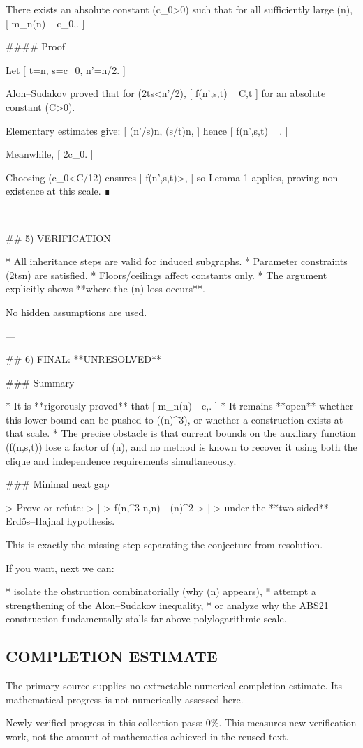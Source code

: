 There exists an absolute constant (c_0>0) such that for all sufficiently large (n),
[
m_n(\lceil\log n\rceil)
\ \ge
c_0,.
]

#### Proof

Let
[
t=\lceil\log n\rceil,
\qquad
s=\left\lfloor c_0\right\rfloor,
\qquad
n'=\lfloor n/2\rfloor.
]

Alon–Sudakov proved that for (2t\le s<n'/2),
[
f(n',s,t)
\ \ge
C,t
]
for an absolute constant (C>0).

Elementary estimates give:
[
\log(n'/s)\ge {}\log n,
\qquad
\log(s/t)\log\log n,
]
hence
[
f(n',s,t)
\ \ge
{}.
]

Meanwhile,
[
\le
2c_0.
]

Choosing (c_0<C/12) ensures
[
f(n',s,t)>,
]
so Lemma 1 applies, proving non-existence at this scale. ∎

---

## 5) VERIFICATION

* All inheritance steps are valid for induced subgraphs.
* Parameter constraints (2t\le s\ll n) are satisfied.
* Floors/ceilings affect constants only.
* The argument explicitly shows **where the (\log\log n) loss occurs**.

No hidden assumptions are used.

---

## 6) FINAL: **UNRESOLVED**

### Summary

* It is **rigorously proved** that
  [
  m_n(\log n)\ \ge\ c,.
  ]
* It remains **open** whether this lower bound can be pushed to ((\log n)^3), or whether a construction exists at that scale.
* The precise obstacle is that current bounds on the auxiliary function (f(n,s,t)) lose a factor of (\log\log n), and no method is known to recover it using both the clique and independence requirements simultaneously.

### Minimal next gap

> Prove or refute:
> [
> f(n,\log^3 n,\log n)\ \gg\ (\log n)^2
> ]
> under the **two-sided** Erdős–Hajnal hypothesis.

This is exactly the missing step separating the conjecture from resolution.

If you want, next we can:

* isolate the obstruction combinatorially (why (\log\log n) appears),
* attempt a strengthening of the Alon–Sudakov inequality,
* or analyze why the ABS21 construction fundamentally stalls far above polylogarithmic scale.


\subsection*{COMPLETION ESTIMATE}
The primary source supplies no extractable numerical completion estimate. Its mathematical progress is not numerically assessed here.

Newly verified progress in this collection pass: $0\%$. This measures new verification work, not the amount of mathematics achieved in the reused text.
